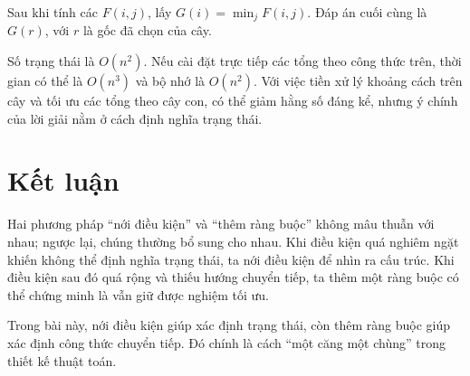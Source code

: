 \documentclass[11pt]{article}
\begin{document}
Sau khi tính các \(F(i,j)\), lấy \(G(i)=\min_j F(i,j)\). Đáp án cuối cùng là
\(G(r)\), với \(r\) là gốc đã chọn của cây.

Số trạng thái là \(O(n^2)\). Nếu cài đặt trực tiếp các tổng theo công thức
trên, thời gian có thể là \(O(n^3)\) và bộ nhớ là \(O(n^2)\). Với việc tiền xử
lý khoảng cách trên cây và tối ưu các tổng theo cây con, có thể giảm hằng số
đáng kể, nhưng ý chính của lời giải nằm ở cách định nghĩa trạng thái.

\section{Kết luận}

Hai phương pháp ``nới điều kiện'' và ``thêm ràng buộc'' không mâu thuẫn với
nhau; ngược lại, chúng thường bổ sung cho nhau. Khi điều kiện quá nghiêm ngặt
khiến không thể định nghĩa trạng thái, ta nới điều kiện để nhìn ra cấu trúc.
Khi điều kiện sau đó quá rộng và thiếu hướng chuyển tiếp, ta thêm một ràng
buộc có thể chứng minh là vẫn giữ được nghiệm tối ưu.

Trong bài này, nới điều kiện giúp xác định trạng thái, còn thêm ràng buộc giúp
xác định công thức chuyển tiếp. Đó chính là cách ``một căng một chùng'' trong
thiết kế thuật toán.
\end{document}
